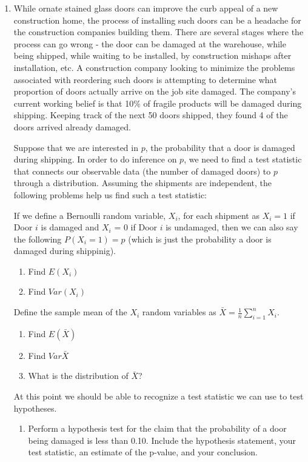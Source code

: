 \documentclass[11pt]{article}
\providecommand{\tightlist}{%
  \setlength{\itemsep}{0pt}\setlength{\parskip}{0pt}}
\begin{document}
\begin{enumerate}
\def\labelenumi{\arabic{enumi}.}
\setcounter{enumi}{2}
\item
  While ornate stained glass doors can improve the curb appeal of a new
  construction home, the process of installing such doors can be a
  headache for the construction companies building them. There are
  several stages where the process can go wrong - the door can be
  damaged at the warehouse, while being shipped, while waiting to be
  installed, by construction mishaps after installation, etc. A
  construction company looking to minimize the problems associated with
  reordering such doors is attempting to determine what proportion of
  doors actually arrive on the job site damaged. The company's current
  working belief is that 10\% of fragile products will be damaged during
  shipping. Keeping track of the next 50 doors shipped, they found 4 of
  the doors arrived already damaged.

  Suppose that we are interested in \(p\), the probability that a door
  is damaged during shipping. In order to do inference on \(p\), we need
  to find a test statistic that connects our observable data (the number
  of damaged doors) to \(p\) through a distribution. Assuming the
  shipments are independent, the following problems help us find such a
  test statistic:

  If we define a Bernoulli random variable, \(X_i\), for each shipment
  as \(X_i = 1\) if Door \(i\) is damaged and \(X_i\) = 0 if Door \(i\)
  is undamaged, then we can also say the following \(P(X_i = 1) = p\)
  (which is just the probability a door is damaged during shippinig).

  \begin{enumerate}
  \def\labelenumii{\alph{enumii}.}
  \tightlist
  \item
    Find \(E(X_i)\)
  \item
    Find \(Var(X_i)\)
  \end{enumerate}

  Define the sample mean of the \(X_i\) random variables as
  \(\bar{X} = \frac{1}{n} \sum_{i=1}^n X_i\).

  \begin{enumerate}
  \def\labelenumii{\alph{enumii}.}
  \setcounter{enumii}{2}
  \tightlist
  \item
    Find \(E(\bar{X})\)
  \item
    Find \(Var{\bar{X}}\)
  \item
    What is the distribution of \(\bar{X}\)?
  \end{enumerate}

  At this point we should be able to recognize a test statistic we can
  use to test hypotheses.

  \begin{enumerate}
  \def\labelenumii{\alph{enumii}.}
  \setcounter{enumii}{5}
  \tightlist
  \item
    Perform a hypothesis test for the claim that the probability of a
    door being damaged is less than 0.10. Include the hypothesis
    statement, your test statistic, an estimate of the p-value, and your
    conclusion.
  \end{enumerate}
\end{enumerate}
\end{document}
